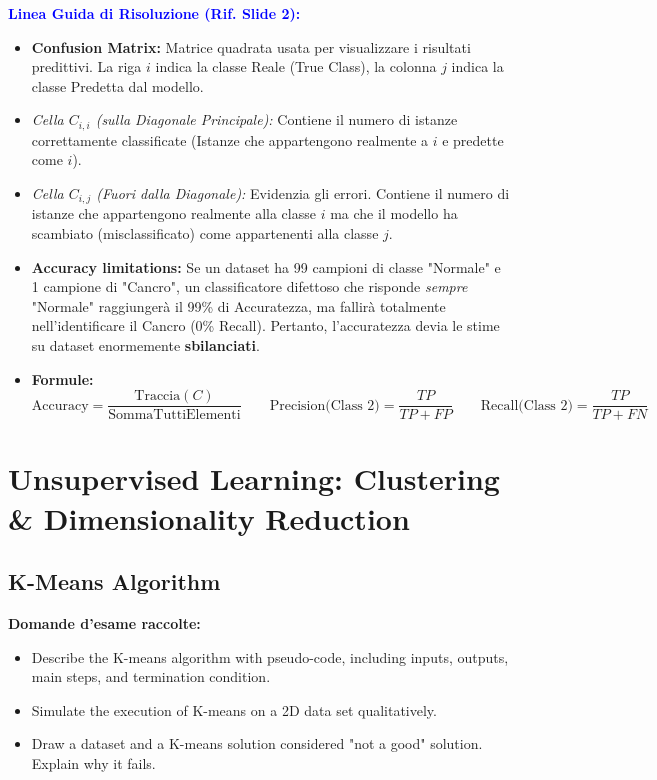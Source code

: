 \documentclass[11pt,a4paper]{article}
\begin{document}
\textbf{\textcolor{blue}{Linea Guida di Risoluzione (Rif. Slide 2):}}
\begin{itemize}
    \item \textbf{Confusion Matrix:} Matrice quadrata usata per visualizzare i risultati predittivi. La riga $i$ indica la classe Reale (True Class), la colonna $j$ indica la classe Predetta dal modello.
    \item \textit{Cella $C_{i,i}$ (sulla Diagonale Principale):} Contiene il numero di istanze correttamente classificate (Istanze che appartengono realmente a $i$ e predette come $i$).
    \item \textit{Cella $C_{i,j}$ (Fuori dalla Diagonale):} Evidenzia gli errori. Contiene il numero di istanze che appartengono realmente alla classe $i$ ma che il modello ha scambiato (misclassificato) come appartenenti alla classe $j$.
    \item \textbf{Accuracy limitations:} Se un dataset ha 99 campioni di classe "Normale" e 1 campione di "Cancro", un classificatore difettoso che risponde \textit{sempre} "Normale" raggiungerà il 99\% di Accuratezza, ma fallirà totalmente nell'identificare il Cancro (0\% Recall). Pertanto, l'accuratezza devia le stime su dataset enormemente \textbf{sbilanciati}.
    \item \textbf{Formule:} 
    $$ \text{Accuracy} = \frac{\text{Traccia}(C)}{\text{SommaTuttiElementi}} \qquad \text{Precision(Class 2)} = \frac{TP}{TP + FP} \qquad \text{Recall(Class 2)} = \frac{TP}{TP + FN} $$
\end{itemize}


\section{Unsupervised Learning: Clustering \& Dimensionality Reduction}

\subsection{K-Means Algorithm}
\textbf{Domande d'esame raccolte:}
\begin{itemize}
    \item Describe the K-means algorithm with pseudo-code, including inputs, outputs, main steps, and termination condition.
    \item Simulate the execution of K-means on a 2D data set qualitatively.
    \item Draw a dataset and a K-means solution considered "not a good" solution. Explain why it fails.
\end{itemize}
\end{document}
